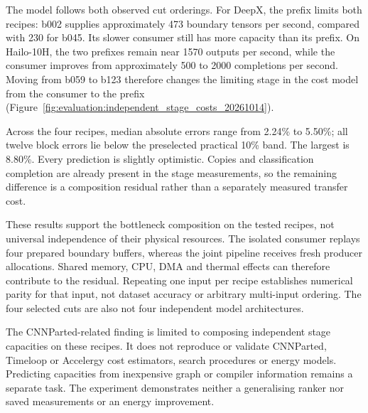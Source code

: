 The model follows both observed cut orderings. For DeepX, the prefix limits both recipes: b002 supplies approximately 473 boundary tensors per second, compared with 230 for b045. Its slower consumer still has more capacity than its prefix. On Hailo-10H, the two prefixes remain near 1570 outputs per second, while the consumer improves from approximately 500 to 2000 completions per second. Moving from b059 to b123 therefore changes the limiting stage in the cost model from the consumer to the prefix (Figure~\ref{fig:evaluation:independent_stage_costs_20261014}).



Across the four recipes, median absolute errors range from \num{2.24}\% to \num{5.50}\%; all twelve block errors lie below the preselected practical \num{10}\% band. The largest is \num{8.80}\%. Every prediction is slightly optimistic. Copies and classification completion are already present in the stage measurements, so the remaining difference is a composition residual rather than a separately measured transfer cost.

These results support the bottleneck composition on the tested recipes, not universal independence of their physical resources. The isolated consumer replays four prepared boundary buffers, whereas the joint pipeline receives fresh producer allocations. Shared memory, CPU, DMA and thermal effects can therefore contribute to the residual. Repeating one input per recipe establishes numerical parity for that input, not dataset accuracy or arbitrary multi-input ordering. The four selected cuts are also not four independent model architectures.

The CNNParted-related finding is limited to composing independent stage capacities on these recipes. It does not reproduce or validate CNNParted, Timeloop or Accelergy cost estimators, search procedures or energy models. Predicting capacities from inexpensive graph or compiler information remains a separate task. The experiment demonstrates neither a generalising ranker nor saved measurements or an energy improvement.
